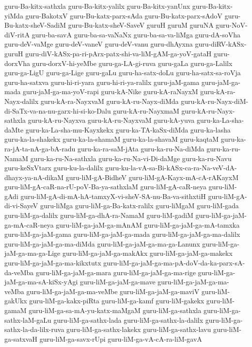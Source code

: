 {guru-Ba-kitx-sathxla
guru-Ba-kitx-yalilx
guru-Ba-kitx-yanUnx
guru-Ba-kitx-yiMda
guru-BakotxV
guru-Bu-katx-parx-sAda
guru-Bu-katx-parx-sAdoV
guru-Bu-katx-sheV-SadiM
guru-Bu-katx-sheV-SaveV
guruH
guruM
guruNA
guru-NoV-diV-ritA
guru-ba-savA
guru-ba-sa-vaNaNx
guru-ba-sa-va-liMga
guru-dA-soVha
guru-deV-vaMge
guru-deV-vaneV
guru-deV-vanu
guru-dhAyxna
guru-diRV-kASx-guruH
guru-diV-kASx-pa-ri-pArx-patx-shi-va-liM-gAM-ga-yoV-gataH
guru-dorxVha
guru-dorxV-hi-yeMbe
guru-ga-LA-gi-ruva
guru-gaLa
guru-ga-Lalilx
guru-ga-LigU
guru-ga-Lige
guru-gaLu
guru-ha-satx-doLu
guru-ha-satx-sa-roVja
guru-ha-satxva
guru-hi-ri-yara
guru-hi-ri-ya-ralilx
guru-jaM-gama
guru-jaM-ga-mada
guru-jaM-ga-ma-yoV-rapi
guru-kA-Nike
guru-kA-raNayxM
guru-kA-ra-Nayx-dalilx
guru-kA-ra-NayxvaM
guru-kA-ru-Nayx-diMda
guru-kA-ru-Nayx-diM-di-SaTx-va-na-nu-garx-hi-si-ko-Dalu
guru-kA-ru-NayxmaM
guru-kA-ru-Nayx-sathxla
guru-kA-ru-Nayxva
guru-kA-ru-NayxvaM
guru-kA-yuva
guru-ka-La-sha-daMte
guru-ka-La-sha-mu-Kayxkekx
guru-ka-TA-kaSx-diMda
guru-ka-lasha
guru-ka-la-shakekx
guru-ka-la-shamaM
guru-ka-la-shavaM
guru-kaqtaM
guru-ka-ra-jA-ta-nA-ga-bA-radu
guru-ka-ra-saM-jAta
guru-ka-ru-Na-diMda
guru-ka-ru-NamaM
guru-ka-ru-Na-sathxla
guru-ka-ru-Na-vi-Di-daMge
guru-ka-ru-Navu
guru-keSxVtarx
guru-ku-la-dalilx
guru-ku-la-vA-sa-Bi-kASx-ca-ra-Na-veV-dA-dhayx-ya-nA-dikaM
guru-liM-gA-BidheV
guru-liM-gA-Kayx-mA-cA-rAKayxM
guru-liM-gA-caR-na-rU-poV-Ba-ya-sathxlaM
guru-liM-gA-caR-neya
guru-liM-gAdi
guru-liM-gA-di-mA-hA-tamxyX-vi-sheV-SA-nu-Ba-va-sithxtiH
guru-liM-gA-di-vi-SayeV
guru-liMga
guru-liM-ga-Ba-katx-ralilx
guru-liMgaM
guru-liM-gada
guru-liM-ga-dalilx
guru-liM-ga-dhA-ra-NamaM
guru-liM-gadiM
guru-liM-ga-jaM-ga-mA-caR-neya
guru-liM-ga-jaM-ga-mAnAM
guru-liM-ga-jaM-ga-mA-tamxka
guru-liM-ga-jaM-gama
guru-liM-ga-jaM-ga-mada
guru-liM-ga-jaM-ga-ma-dalilx
guru-liM-ga-jaM-ga-ma-diMda
guru-liM-ga-jaM-ga-ma-ga-Lanunx
guru-liM-ga-jaM-ga-ma-ga-Lige
guru-liM-ga-jaM-ga-makAkx
guru-liM-ga-jaM-ga-makekx
guru-liM-ga-jaM-ga-ma-kikxtutx
guru-liM-ga-jaM-ga-ma-pA-doV-da-ka-parx-sA-da-veMba
guru-liM-ga-jaM-ga-mara
guru-liM-ga-jaM-ga-ma-rige
guru-liM-ga-jaM-ga-ma-sA-kiSx-yAgi
guru-liM-ga-jaM-ga-mave
guru-liM-ga-jaM-ga-ma-veMba
guru-liM-ga-jaM-ga-ma-veMbe
guru-liM-ga-jaM-ga-maviV
guru-liM-gakUkx
guru-liM-ga-kakx-piRta
guru-liM-ga-kamf
guru-liM-gakekx
guru-liM-gamaM
guru-liM-ga-sa-mA-yu-katx-maMgaM
guru-liM-ga-sathxla
guru-liM-ga-sathx-laM-gaLu
guru-liM-ga-sathx-lada
guru-liM-ga-sathx-la-dalilx
guru-liM-ga-sathx-la-da-lilx-ruva
guru-liM-ga-sathx-lakekx
guru-liM-ga-sathx-lavu
guru-liM-ga-satxvaH
guru-liM-ga-savx-rUpi
guru-liM-ga-vA-cA-ra-liM-gavA
}
